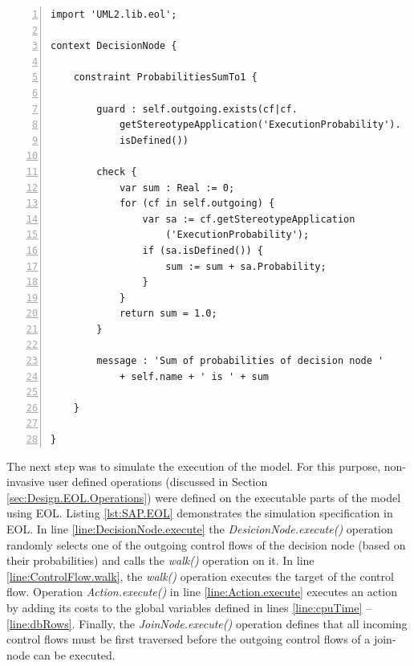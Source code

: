 \begin{lstlisting}[basicstyle=\ttfamily\footnotesize, flexiblecolumns=true, numbers=left, nolol=true, caption=Performance-Annotated Activity Diagram Constraints using EVL, label=lst:SAP.EVL, language=EVL, tabsize=2]
import 'UML2.lib.eol';

context DecisionNode {
	
	constraint ProbabilitiesSumTo1 {
		
		guard : self.outgoing.exists(cf|cf.
			getStereotypeApplication('ExecutionProbability').
			isDefined())
		
		check {
			var sum : Real := 0;
			for (cf in self.outgoing) {
				var sa := cf.getStereotypeApplication
					('ExecutionProbability');
				if (sa.isDefined()) {
					sum := sum + sa.Probability;
				}
			}
			return sum = 1.0;
		}
		
		message : 'Sum of probabilities of decision node ' 
			+ self.name + ' is ' + sum 
		
	}
	
}
\end{lstlisting}

The next step was to simulate the execution of the model. For this purpose, non-invasive user defined operations (discussed in Section \ref{sec:Design.EOL.Operations}) were defined on the executable parts of the model using EOL. Listing \ref{lst:SAP.EOL} demonstrates the simulation specification in EOL. In line \ref{line:DecisionNode.execute} the \emph{DesicionNode.execute()} operation randomly selects one of the outgoing control flows of the decision node (based on their probabilities) and calls the \emph{walk()} operation on it. In line \ref{line:ControlFlow.walk}, the \emph{walk()} operation executes the target of the control flow. Operation \emph{Action.execute()} in line \ref{line:Action.execute} executes an action by adding its costs to the global variables defined in lines \ref{line:cpuTime} -- \ref{line:dbRows}. Finally, the \emph{JoinNode.execute()} operation defines that all incoming control flows must be first traversed before the outgoing control flows of a join-node can be executed.

